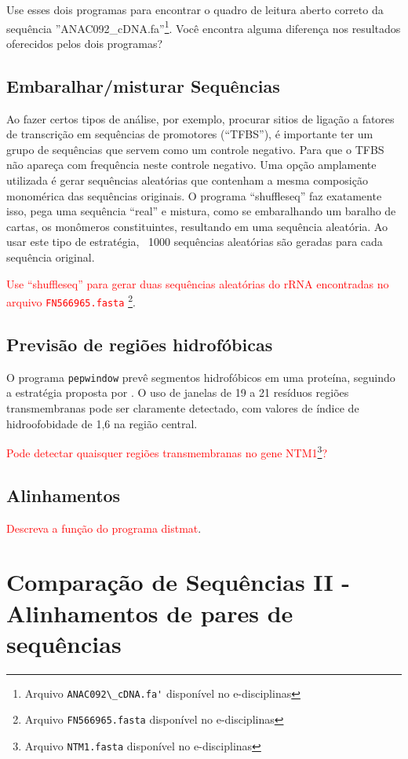 \documentclass[letter,11pt]{book}
\begin{document}
{
\color{red}Use esses dois programas para encontrar o quadro de leitura aberto correto da sequência ''ANAC092\_cDNA.fa''\footnote{Arquivo \Verb+ANAC092\_cDNA.fa'+ disponível no e-disciplinas}. Você encontra alguma diferença nos resultados oferecidos pelos dois programas? 
}

\section{Embaralhar/misturar Sequências}

Ao fazer certos tipos de análise, por exemplo, procurar sitios de ligação a fatores de transcrição em sequências de promotores (``TFBS''), é importante ter um grupo de sequências que servem como um controle negativo. Para que o TFBS não apareça com frequência neste controle negativo. Uma opção amplamente utilizada é gerar sequências aleatórias que contenham a mesma composição monomérica das sequências originais. O programa ``shuffleseq'' faz exatamente isso, pega uma sequência ``real'' e mistura, como se embaralhando um baralho de cartas, os monômeros constituintes, resultando em uma sequência aleatória. Ao usar este tipo de estratégia, ~1000 sequências aleatórias são geradas para cada sequência original.

\textcolor{red}{Use ``shuffleseq'' para gerar duas sequências aleatórias do rRNA encontradas no arquivo \Verb+FN566965.fasta+ \footnote{Arquivo \Verb+FN566965.fasta+ disponível no e-disciplinas}}.

\section{Previsão de regiões hidrofóbicas} O programa \Verb+pepwindow+ prevê segmentos hidrofóbicos em uma proteína, seguindo a estratégia proposta por \citep{Kyte1982}. O uso de janelas de 19 a 21 resíduos regiões transmembranas pode ser claramente detectado, com valores de índice de hidroofobidade de 1,6 na região central.

\textcolor{red}{Pode detectar quaisquer regiões transmembranas no gene NTM1\footnote{Arquivo \Verb+NTM1.fasta+ disponível no e-disciplinas}?}

\section{Alinhamentos}

\textcolor{red}{Descreva a função do programa distmat}.

\chapter{Comparação de Sequências II - Alinhamentos de pares de sequências}
\end{document}
